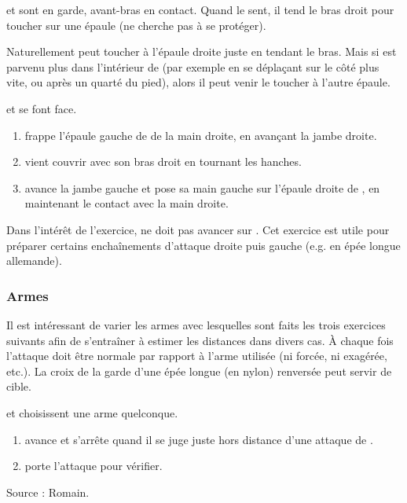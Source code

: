 \begin{exercice}
\label{struct:ex:contact:frappe-épaules}

\A et \D sont en garde, avant-bras en contact.
Quand \A le sent, il tend le bras droit pour toucher \D sur une épaule (\D ne cherche pas à se protéger).

Naturellement \A peut toucher \D à l'épaule droite juste en tendant le bras.
Mais si \A est parvenu plus dans l'intérieur de \D (par exemple en se déplaçant sur le côté plus vite, ou après un quarté du pied), alors il peut venir le toucher à l'autre épaule.

\end{exercice}


\begin{exercice}
\label{struct:ex:frappe-gauche-droite}

\A et \D se font face.

\begin{enumerate}
	\item \A frappe l'épaule gauche de \D de la main droite, en avançant la jambe droite.
	\item \D vient couvrir avec son bras droit en tournant les hanches.
	\item \A avance la jambe gauche et pose sa main gauche sur l'épaule droite de \D, en maintenant le contact avec la main droite.
\end{enumerate}

Dans l'intérêt de l'exercice, \D ne doit pas avancer sur \A.
Cet exercice est utile pour préparer certains enchaînements d'attaque droite puis gauche (e.g.
en épée longue allemande).

\end{exercice}


\subsubsection{Armes}


Il est intéressant de varier les armes avec lesquelles sont faits les trois exercices suivants afin de s'entraîner à estimer les distances dans divers cas.
À chaque fois l'attaque doit être normale par rapport à l'arme utilisée (ni forcée, ni exagérée, etc.).
La croix de la garde d'une épée longue (en nylon) renversée peut servir de cible.


\begin{exercice}
\A et \D choisissent une arme quelconque.

\begin{enumerate}
	\item \A avance et s'arrête quand il se juge juste hors distance d'une attaque de \D.
	
	\item \D porte l'attaque pour vérifier.
\end{enumerate}

Source : Romain.

\end{exercice}


